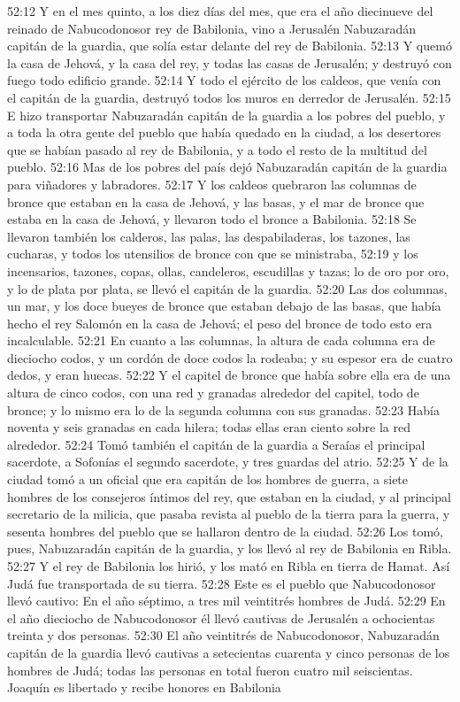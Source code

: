 52:12 Y en el mes quinto, a los diez días del mes, que era el año diecinueve del reinado de Nabucodonosor rey de Babilonia, vino a Jerusalén Nabuzaradán capitán de la guardia, que solía estar delante del rey de Babilonia.  
52:13 Y quemó la casa de Jehová, y la casa del rey, y todas las casas de Jerusalén; y destruyó con fuego todo edificio grande.  
52:14 Y todo el ejército de los caldeos, que venía con el capitán de la guardia, destruyó todos los muros en derredor de Jerusalén.  
52:15 E hizo transportar Nabuzaradán capitán de la guardia a los pobres del pueblo, y a toda la otra gente del pueblo que había quedado en la ciudad, a los desertores que se habían pasado al rey de Babilonia, y a todo el resto de la multitud del pueblo.  
52:16 Mas de los pobres del país dejó Nabuzaradán capitán de la guardia para viñadores y labradores.  
52:17 Y los caldeos quebraron las columnas de bronce que estaban en la casa de Jehová, y las basas, y el mar de bronce que estaba en la casa de Jehová, y llevaron todo el bronce a Babilonia.  
52:18 Se llevaron también los calderos, las palas, las despabiladeras, los tazones, las cucharas, y todos los utensilios de bronce con que se ministraba,  
52:19 y los incensarios, tazones, copas, ollas, candeleros, escudillas y tazas; lo de oro por oro, y lo de plata por plata, se llevó el capitán de la guardia.  
52:20 Las dos columnas, un mar, y los doce bueyes de bronce que estaban debajo de las basas, que había hecho el rey Salomón en la casa de Jehová; el peso del bronce de todo esto era incalculable.  
52:21 En cuanto a las columnas, la altura de cada columna era de dieciocho codos,  y un cordón de doce codos la rodeaba; y su espesor era de cuatro dedos, y eran huecas.  
52:22 Y el capitel de bronce que había sobre ella era de una altura de cinco codos,  con una red y granadas alrededor del capitel, todo de bronce; y lo mismo era lo de la segunda columna con sus granadas.  
52:23 Había noventa y seis granadas en cada hilera; todas ellas eran ciento sobre la red alrededor.  
52:24 Tomó también el capitán de la guardia a Seraías el principal sacerdote, a Sofonías el segundo sacerdote, y tres guardas del atrio.  
52:25 Y de la ciudad tomó a un oficial que era capitán de los hombres de guerra, a siete hombres de los consejeros íntimos del rey, que estaban en la ciudad, y al principal secretario de la milicia, que pasaba revista al pueblo de la tierra para la guerra, y sesenta hombres del pueblo que se hallaron dentro de la ciudad.  
52:26 Los tomó, pues, Nabuzaradán capitán de la guardia, y los llevó al rey de Babilonia en Ribla.  
52:27 Y el rey de Babilonia los hirió, y los mató en Ribla en tierra de Hamat. Así Judá fue transportada de su tierra.  
52:28 Este es el pueblo que Nabucodonosor llevó cautivo: En el año séptimo, a tres mil veintitrés hombres de Judá.  
52:29 En el año dieciocho de Nabucodonosor él llevó cautivas de Jerusalén a ochocientas treinta y dos personas.  
52:30 El año veintitrés de Nabucodonosor, Nabuzaradán capitán de la guardia llevó cautivas a setecientas cuarenta y cinco personas de los hombres de Judá; todas las personas en total fueron cuatro mil seiscientas.  
Joaquín es libertado y recibe honores en Babilonia  
  
